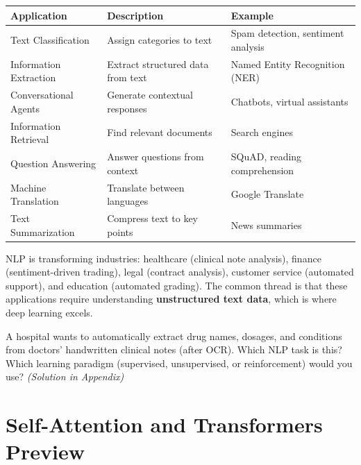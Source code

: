 \documentclass[11pt,a4paper]{article}
\begin{document}
\begin{center}
\renewcommand{\arraystretch}{1.3}
\begin{tabular}{@{}p{4cm}p{5cm}p{4.5cm}@{}}
\toprule
\textbf{Application} & \textbf{Description} & \textbf{Example} \\
\midrule
Text Classification & Assign categories to text & Spam detection, sentiment analysis \\
Information Extraction & Extract structured data from text & Named Entity Recognition (NER) \\
Conversational Agents & Generate contextual responses & Chatbots, virtual assistants \\
Information Retrieval & Find relevant documents & Search engines \\
Question Answering & Answer questions from context & SQuAD, reading comprehension \\
Machine Translation & Translate between languages & Google Translate \\
Text Summarization & Compress text to key points & News summaries \\
\bottomrule
\end{tabular}
\end{center}

\begin{tcolorbox}[intuitionbox={Industry Impact}]
NLP is transforming industries: healthcare (clinical note analysis), finance (sentiment-driven trading), legal (contract analysis), customer service (automated support), and education (automated grading). The common thread is that these applications require understanding \textbf{unstructured text data}, which is where deep learning excels.
\end{tcolorbox}

\begin{tcolorbox}[questionbox={Self-Check Q5}]
A hospital wants to automatically extract drug names, dosages, and conditions from doctors' handwritten clinical notes (after OCR). Which NLP task is this? Which learning paradigm (supervised, unsupervised, or reinforcement) would you use? \textit{(Solution in Appendix)}
\end{tcolorbox}

\section{Self-Attention and Transformers Preview}
\end{document}
